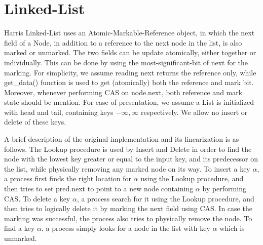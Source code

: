 
\newcommand{\search}{\mbox{\sc Search}}
\newcommand{\recover}{\mbox{\sc Recover}}
\newcommand{\insertlst}{\mbox{\sc Insert}}
\newcommand{\delete}{\mbox{\sc Delete}}
\newcommand{\find}{\mbox{\sc Find}}
\newcommand{\getdata}{\mbox{get\_data()}}


\newcommand{\init}{\mbox{$\bot$}}
\newcommand{\NULL}{\mbox{\sc Null}}
\newcommand{\fail}{\mbox{\sc Fail}}

\newcommand{\Info}{\mbox{Info}}

\newenvironment{routine}[1][htb] {
	\renewcommand{\algorithmcfname}{Routine}%
	\begin{algorithm}[#1]%
	}{\end{algorithm}}




\section{Linked-List}

Harris Linked-List uses an Atomic-Markable-Reference object, in which the next field of a Node, in addition to a reference to the next node in the list, is also marked or unmarked. The two fields can be update atomically, either together or individually. This can be done by using the most-significant-bit of next for the marking. For simplicity, we assume reading next returns the reference only, while get\_data() function is used to get (atomically) both the reference and mark bit. Moreover, whenever performing CAS on node.next, both reference and mark state should be mention.
For ease of presentation, we assume a List is initialized with head and tail, containing keys $-\infty, \infty$ respectively. We allow no insert or delete of these keys.


A brief description of the original implementation and its linearization is as follows. The Lookup procedure is used by Insert and Delete in order to find the node with the lowest key greater or equal to the input key, and its predecessor on the list, while physically removing any marked node on its way. To insert a key $\alpha$, a process first finds the right location for $\alpha$ using the Lookup procedure, and then tries to set pred.next to point to a new node containing $\alpha$ by performing CAS. To delete a key $\alpha$, a process search for it using the Lookup procedure, and then tries to logically delete it by marking the next field using CAS. In case the marking was successful, the process also tries to physically remove the node. To find a key $\alpha$, a process simply looks for a node in the list with key $\alpha$ which is unmarked.

